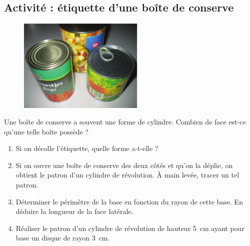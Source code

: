 
\subsection*{Activité : étiquette d'une boîte de conserve}

\begin{figure}
\includegraphics[width=6cm]{conserve.pdf} 
\end{figure}


Une boîte de conserve a souvent une forme de cylindre. Combien de face est-ce qu'une telle boîte possède ?

\begin{enumerate}
    \item
        Si on décolle l'étiquette, quelle forme a-t-elle ?
    \item

 Si on ouvre une boîte de conserve des deux côtés et qu'on la déplie, on obtient le patron d'un cylindre de révolution. À main levée, tracer un tel patron.
 \item
    Déterminer le périmètre de la base en fonction du rayon de cette base. En déduire la longueur de la face latérale. 
\item

    Réaliser le patron d'un cylindre de révolution de hauteur \SI{5}{\centi\meter} ayant pour base un disque de rayon \SI{3}{\centi\meter}. 

\end{enumerate}
